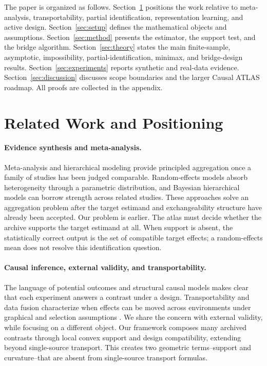 \documentclass[11pt]{article}
\numberwithin{equation}{section}
\newcommand{\1}{\mathbf 1}
\begin{document}
The paper is organized as follows.  Section~\ref{sec:related} positions the work relative to meta-analysis, transportability, partial identification, representation learning, and active design.  Section~\ref{sec:setup} defines the mathematical objects and assumptions.  Section~\ref{sec:method} presents the estimator, the support test, and the bridge algorithm.  Section~\ref{sec:theory} states the main finite-sample, asymptotic, impossibility, partial-identification, minimax, and bridge-design results.  Section~\ref{sec:experiments} reports synthetic and real-data evidence.  Section~\ref{sec:discussion} discusses scope boundaries and the larger Causal ATLAS roadmap.  All proofs are collected in the appendix.

\section{Related Work and Positioning}
\label{sec:related}

\paragraph{Evidence synthesis and meta-analysis.}
Meta-analysis and hierarchical modeling provide principled aggregation once a family of studies has been judged comparable.  Random-effects models absorb heterogeneity through a parametric distribution, and Bayesian hierarchical models can borrow strength across related studies.  These approaches solve an aggregation problem after the target estimand and exchangeability structure have already been accepted.  Our problem is earlier.  The atlas must decide whether the archive supports the target estimand at all.  When support is absent, the statistically correct output is the set of compatible target effects; a random-effects mean does not resolve this identification question.

\paragraph{Causal inference, external validity, and transportability.}
The language of potential outcomes \citep{neyman1923,rubin1974estimating,imbens2015causal} and structural causal models \citep{pearl2009causality} makes clear that each experiment answers a contrast under a design.  Transportability and data fusion characterize when effects can be moved across environments under graphical and selection assumptions \citep{bareinboim2016causal}.  We share the concern with external validity, while focusing on a different object.  Our framework composes many archived contrasts through local convex support and design compatibility, extending beyond single-source transport.  This creates two geometric terms--support and curvature--that are absent from single-source transport formulas.
\end{document}

